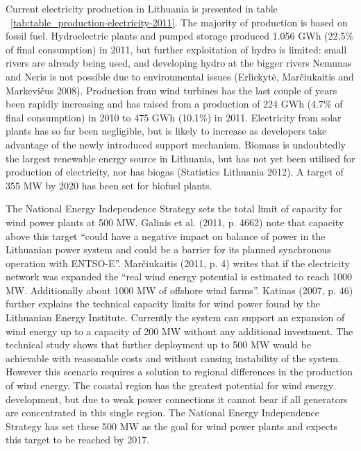 \documentclass[a4paper, 12pt]{article}
\begin{document}

Current electricity production in Lithuania is presented in table ~\ref{tab:table_production-electricity-2011}. The majority of production is based on fossil fuel. Hydroelectric plants and pumped storage produced 1.056 GWh (22.5\% of final consumption) in 2011, but further exploitation of hydro is limited: small rivers are already being used, and developing hydro at the bigger rivers Nemunas and Neris is not possible due to environmental issues (Erlickytė, Marčiukaitis and Markevičus 2008). Production from wind turbines has the last couple of years been rapidly increasing and has raised from a production of 224 GWh (4.7\% of final consumption) in 2010 to 475 GWh (10.1\%) in 2011. Electricity from solar plants has so far been negligible, but is likely to increase as developers take advantage of the newly introduced support mechanism. Biomass is undoubtedly the largest renewable energy source in Lithuania, but has not yet been utilised for production of electricity, nor has biogas (Statistics Lithuania 2012). A target of 355 MW by 2020 has been set for biofuel plants. 

The National Energy Independence Strategy sets the total limit of capacity for wind power plants at 500 MW. Galinis et al. (2011, p. 4662) note that capacity above this target ``could have a negative impact on balance of power in the Lithuanian power system and could be a barrier for its planned synchronous operation with ENTSO-E''. Marčiukaitis (2011, p. 4) writes that if the electricity network was expanded the ``real wind energy potential is estimated to reach 1000 MW. Additionally about 1000 MW of offshore wind farms''. Katinas (2007, p. 46) further explains the technical capacity limits for wind power found by the Lithuanian Energy Institute. Currently the system can support an expansion of wind energy up to a capacity of 200 MW without any additional investment. The technical study shows that further deployment up to 500 MW would be achievable with reasonable costs and without causing instability of the system. However this scenario requires a solution to regional differences in the production of wind energy. The coastal region has the greatest potential for wind energy development, but due to weak power connections it cannot bear if all generators are concentrated in this single region. The National Energy Independence Strategy has set these 500 MW as the goal for wind power plants and expects this target to be reached by 2017. 
\end{document}
